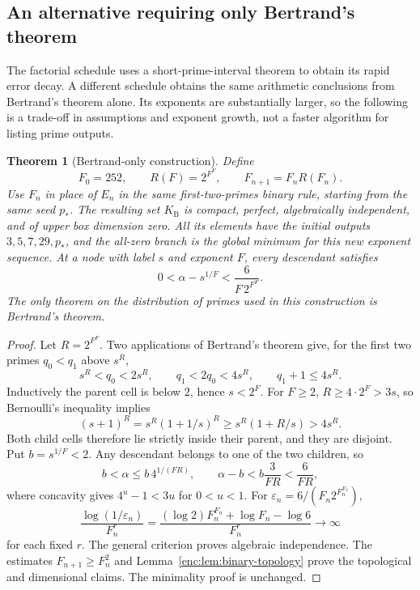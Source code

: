 \documentclass[11pt,a4paper]{article}
\newtheorem{theorem}{Theorem}[section]
\theoremstyle{definition}
\theoremstyle{remark}
\numberwithin{equation}{section}
\begin{document}
\subsection{An alternative requiring only Bertrand's theorem}

The factorial schedule uses a short-prime-interval theorem to obtain its
rapid error decay.  A different schedule obtains the same arithmetic
conclusions from Bertrand's theorem alone.  Its exponents are substantially
larger, so the following is a trade-off in assumptions and exponent growth,
not a faster algorithm for listing prime outputs.

\begin{theorem}[Bertrand-only construction]
\label{enc:thm:bertrand-cantor}
Define
\[
 F_0=252,\qquad R(F)=2^{F^F},\qquad
 F_{n+1}=F_nR(F_n).
\]
Use $F_n$ in place of $E_n$ in the same first-two-primes binary rule, starting
from the same seed $p_*$.  The resulting set $K_{\mathrm B}$ is compact,
perfect, algebraically independent, and of upper box dimension zero.
All its elements have the initial outputs $3,5,7,29,p_*$, and the all-zero
branch is the global minimum for this new exponent sequence.
At a node with label $s$ and exponent $F$, every descendant satisfies
\begin{equation}
\label{enc:eq:bertrand-uniform-error}
 0<\alpha-s^{1/F}<\frac{6}{F\,2^{F^F}}.
\end{equation}
The only theorem on the distribution of primes used in this construction
is Bertrand's theorem.
\end{theorem}

\begin{proof}
Let $R=2^{F^F}$.  Two applications of Bertrand's theorem
\cite{Bertrand} give, for the first two primes $q_0<q_1$ above $s^R$,
\[
 s^R<q_0<2s^R,\qquad q_1<2q_0<4s^R,
 \qquad q_1+1\le4s^R.
\]
Inductively the parent cell is below $2$, hence $s<2^F$.
For $F\ge2$, $R\ge4\cdot2^F>3s$, so Bernoulli's inequality implies
\[
 (s+1)^R=s^R(1+1/s)^R
 \ge s^R(1+R/s)>4s^R.
\]
Both child cells therefore lie strictly inside their parent, and they are
disjoint.  Put $b=s^{1/F}<2$.  Any descendant belongs to one of the two
children, so
\[
 b<\alpha\le b\,4^{1/(FR)},
 \qquad
 \alpha-b<b\frac{3}{FR}<\frac6{FR},
\]
where concavity gives $4^u-1<3u$ for $0<u<1$.
For $\varepsilon_n=6/(F_n2^{F_n^{F_n}})$,
\[
 \frac{\log(1/\varepsilon_n)}{F_n^r}
 =\frac{(\log2)F_n^{F_n}+\log F_n-\log6}{F_n^r}
 \longrightarrow\infty
\]
for each fixed $r$.  The general criterion proves algebraic independence.
The estimates $F_{n+1}\ge F_n^2$ and
Lemma~\ref{enc:lem:binary-topology} prove the topological and dimensional
claims.  The minimality proof is unchanged.
\end{proof}
\end{document}
